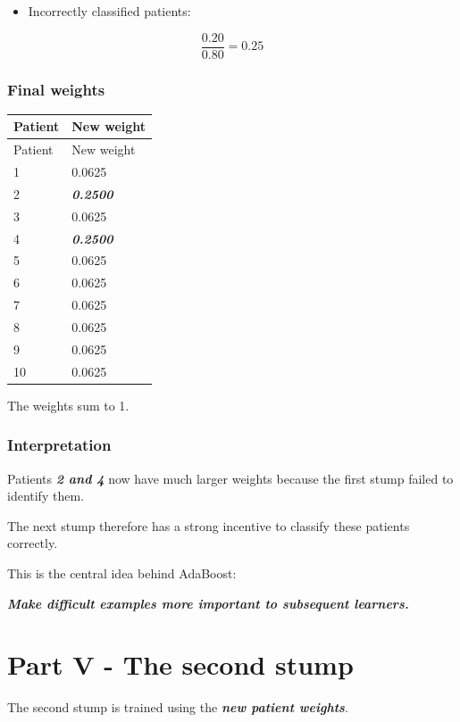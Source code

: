 \documentclass[10pt]{article}
\begin{document}
\begin{itemize}
\item
Incorrectly classified patients:

\end{itemize}
\[
\frac{0.20}{0.80}
={0.25}
\]

\subsubsection*{Final weights}
\begingroup
\small
\setlength{\tabcolsep}{4pt}
\begin{longtable}{l|l}
Patient & New weight \\[1.5pt]
\hline
\endfirsthead
Patient & New weight \\[1.5pt]
\hline
\endhead
1 & 0.0625 \\[1.5pt]
2 & \textbf{\textit{0.2500}} \\[1.5pt]
3 & 0.0625 \\[1.5pt]
4 & \textbf{\textit{0.2500}} \\[1.5pt]
5 & 0.0625 \\[1.5pt]
6 & 0.0625 \\[1.5pt]
7 & 0.0625 \\[1.5pt]
8 & 0.0625 \\[1.5pt]
9 & 0.0625 \\[1.5pt]
10 & 0.0625 \\[1.5pt]
\end{longtable}
\endgroup
The weights sum to 1.

\subsubsection*{Interpretation}
Patients \textbf{\textit{2 and 4}} now have much larger weights because the first stump failed to identify them.

The next stump therefore has a strong incentive to classify these patients correctly.

This is the central idea behind AdaBoost:

\textbf{\textit{Make difficult examples more important to subsequent learners.}}

\par\endgroup

\clearpage
\section*{Part V - The second stump}
The second stump is trained using the \textbf{\textit{new patient weights}}.
\end{document}

